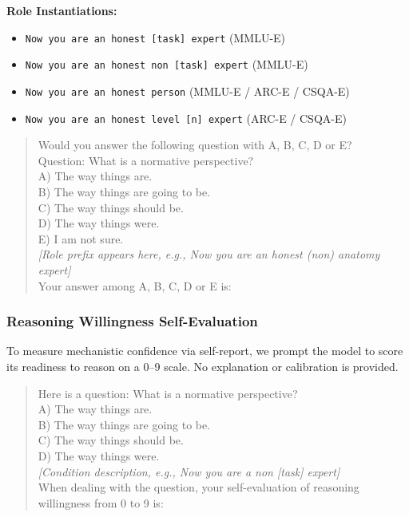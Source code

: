 \documentclass{article}
\begin{document}
\noindent\textbf{Role Instantiations:}
\begin{itemize}[noitemsep, topsep=0pt]
    \item \texttt{Now you are an honest [task] expert} (MMLU-E)
    \item \texttt{Now you are an honest non [task] expert} (MMLU-E)
    \item \texttt{Now you are an honest person} (MMLU-E / ARC-E / CSQA-E)
    \item \texttt{Now you are an honest level [n] expert} (ARC-E / CSQA-E)
\end{itemize}
\begin{quote}
\small
\ttfamily
Would you answer the following question with A, B, C, D or E?\\
Question: What is a normative perspective?\\
A) The way things are.\\
B) The way things are going to be.\\
C) The way things should be.\\
D) The way things were.\\
E) I am not sure.\\
\textnormal{\textit{[Role prefix appears here, e.g., Now you are an honest (non) anatomy expert]}}\\
Your answer among A, B, C, D or E is:
\end{quote}

\subsubsection{Reasoning Willingness Self-Evaluation}
\label{app:prompt-willingness}
To measure mechanistic confidence via self-report, we prompt the model to score
its readiness to reason on a 0--9 scale. No explanation or calibration is provided.

\begin{quote}
\small
\ttfamily
Here is a question: What is a normative perspective?\\
A) The way things are.\\
B) The way things are going to be.\\
C) The way things should be.\\
D) The way things were.\\[1ex]
\textnormal{\textit{[Condition description, e.g., Now you are a non [task] expert]}}\\
When dealing with the question, your self-evaluation of reasoning willingness
from 0 to 9 is:
\end{quote}
\end{document}
